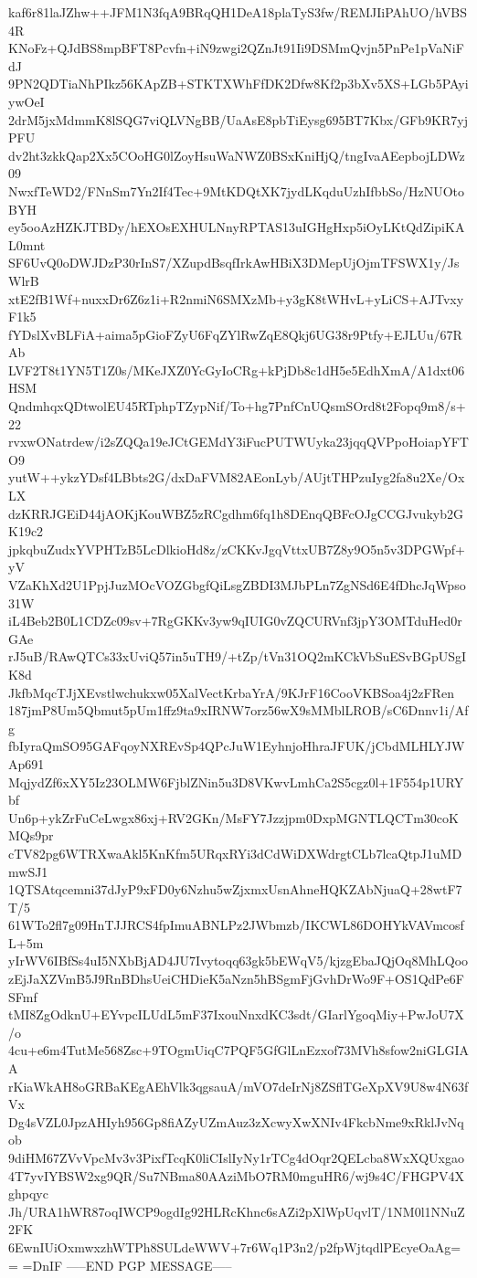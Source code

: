 kaf6r81laJZhw++JFM1N3fqA9BRqQH1DeA18plaTyS3fw/REMJIiPAhUO/hVBS4R
KNoFz+QJdBS8mpBFT8Pcvfn+iN9zwgi2QZnJt91Ii9DSMmQvjn5PnPe1pVaNiFdJ
9PN2QDTiaNhPIkz56KApZB+STKTXWhFfDK2Dfw8Kf2p3bXv5XS+LGb5PAyiywOeI
2drM5jxMdmmK8lSQG7viQLVNgBB/UaAsE8pbTiEysg695BT7Kbx/GFb9KR7yjPFU
dv2ht3zkkQap2Xx5COoHG0lZoyHsuWaNWZ0BSxKniHjQ/tngIvaAEepbojLDWz09
NwxfTeWD2/FNnSm7Yn2If4Tec+9MtKDQtXK7jydLKqduUzhIfbbSo/HzNUOtoBYH
ey5ooAzHZKJTBDy/hEXOsEXHULNnyRPTAS13uIGHgHxp5iOyLKtQdZipiKAL0mnt
SF6UvQ0oDWJDzP30rInS7/XZupdBsqfIrkAwHBiX3DMepUjOjmTFSWX1y/JsWlrB
xtE2fB1Wf+nuxxDr6Z6z1i+R2nmiN6SMXzMb+y3gK8tWHvL+yLiCS+AJTvxyF1k5
fYDslXvBLFiA+aima5pGioFZyU6FqZYlRwZqE8Qkj6UG38r9Ptfy+EJLUu/67RAb
LVF2T8t1YN5T1Z0s/MKeJXZ0YcGyIoCRg+kPjDb8c1dH5e5EdhXmA/A1dxt06HSM
QndmhqxQDtwolEU45RTphpTZypNif/To+hg7PnfCnUQsmSOrd8t2Fopq9m8/s+22
rvxwONatrdew/i2sZQQa19eJCtGEMdY3iFucPUTWUyka23jqqQVPpoHoiapYFTO9
yutW++ykzYDsf4LBbts2G/dxDaFVM82AEonLyb/AUjtTHPzuIyg2fa8u2Xe/OxLX
dzKRRJGEiD44jAOKjKouWBZ5zRCgdhm6fq1h8DEnqQBFcOJgCCGJvukyb2GK19c2
jpkqbuZudxYVPHTzB5LcDlkioHd8z/zCKKvJgqVttxUB7Z8y9O5n5v3DPGWpf+yV
VZaKhXd2U1PpjJuzMOcVOZGbgfQiLsgZBDI3MJbPLn7ZgNSd6E4fDhcJqWpso31W
iL4Beb2B0L1CDZc09sv+7RgGKKv3yw9qIUIG0vZQCURVnf3jpY3OMTduHed0rGAe
rJ5uB/RAwQTCs33xUviQ57in5uTH9/+tZp/tVn31OQ2mKCkVbSuESvBGpUSgIK8d
JkfbMqcTJjXEvstlwchukxw05XalVectKrbaYrA/9KJrF16CooVKBSoa4j2zFRen
187jmP8Um5Qbmut5pUm1ffz9ta9xIRNW7orz56wX9sMMblLROB/sC6Dnnv1i/Afg
fbIyraQmSO95GAFqoyNXREvSp4QPcJuW1EyhnjoHhraJFUK/jCbdMLHLYJWAp691
MqjydZf6xXY5Iz23OLMW6FjblZNin5u3D8VKwvLmhCa2S5cgz0l+1F554p1URYbf
Un6p+ykZrFuCeLwgx86xj+RV2GKn/MsFY7Jzzjpm0DxpMGNTLQCTm30coKMQs9pr
cTV82pg6WTRXwaAkl5KnKfm5URqxRYi3dCdWiDXWdrgtCLb7lcaQtpJ1uMDmwSJ1
1QTSAtqcemni37dJyP9xFD0y6Nzhu5wZjxmxUsnAhneHQKZAbNjuaQ+28wtF7T/5
61WTo2fl7g09HnTJJRCS4fpImuABNLPz2JWbmzb/IKCWL86DOHYkVAVmcosfL+5m
yIrWV6IBfSs4uI5NXbBjAD4JU7Ivytoqq63gk5bEWqV5/kjzgEbaJQjOq8MhLQoo
zEjJaXZVmB5J9RnBDhsUeiCHDieK5aNzn5hBSgmFjGvhDrWo9F+OS1QdPe6FSFmf
tMI8ZgOdknU+EYvpcILUdL5mF37IxouNnxdKC3sdt/GIarlYgoqMiy+PwJoU7X/o
4cu+e6m4TutMe568Zsc+9TOgmUiqC7PQF5GfGlLnEzxof73MVh8sfow2niGLGIAA
rKiaWkAH8oGRBaKEgAEhVlk3qgsauA/mVO7deIrNj8ZSflTGeXpXV9U8w4N63fVx
Dg4sVZL0JpzAHIyh956Gp8fiAZyUZmAuz3zXcwyXwXNIv4FkcbNme9xRklJvNqob
9diHM67ZVvVpcMv3v3PixfTcqK0liCIslIyNy1rTCg4dOqr2QELcba8WxXQUxgao
4T7yvIYBSW2xg9QR/Su7NBma80AAziMbO7RM0mguHR6/wj9s4C/FHGPV4Xghpqyc
Jh/URA1hWR87oqIWCP9ogdIg92HLRcKhnc6sAZi2pXlWpUqvlT/1NM0l1NNuZ2FK
6EwnIUiOxmwxzhWTPh8SULdeWWV+7r6Wq1P3n2/p2fpWjtqdlPEcyeOaAg==
=DnIF
-----END PGP MESSAGE-----
